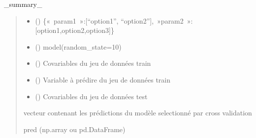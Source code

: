 \documentclass[letterpaper,10pt,french]{sphinxmanual}
\begin{document}

\begin{fulllineitems}
\label{\detokenize{general:general.param_selection}}
\pysigstartsignatures
{}
\pysigstopsignatures
\sphinxAtStartPar
\_summary\_
\begin{quote}\begin{description}
\begin{itemize}
\item {} 
\sphinxAtStartPar
{} () \textendash{} \{« param1 »:{[}“option1”, “option2”{]}, »param2 »:{[}option1,option2,option3{]}\}

\item {} 
\sphinxAtStartPar
{} () \textendash{} model(random\_state=10)

\item {} 
\sphinxAtStartPar
{} () \textendash{} Co\sphinxhyphen{}variables du jeu de données train

\item {} 
\sphinxAtStartPar
{} () \textendash{} Variable à prédire du jeu de données train

\item {} 
\sphinxAtStartPar
{} () \textendash{} Co\sphinxhyphen{}variables du jeu de données test

\end{itemize}

\sphinxAtStartPar
vecteur contenant les prédictions du modèle selectionné par cross validation

\sphinxAtStartPar
pred (np.array ou pd.DataFrame)

\end{description}\end{quote}

\end{fulllineitems}
\end{document}
